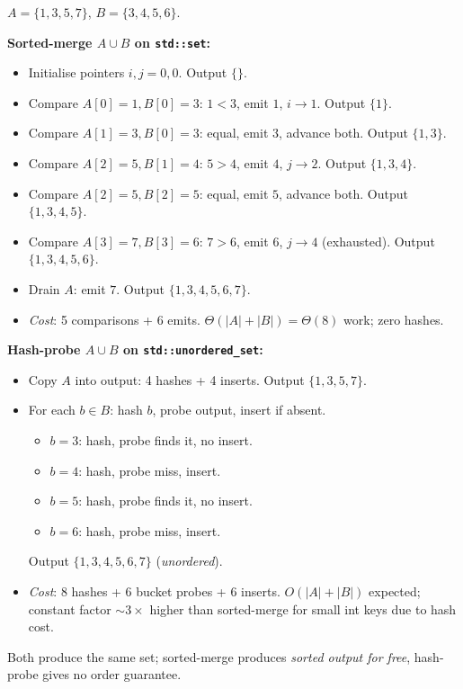 \documentclass[11pt]{article}
\begin{document}
\begin{examplebox}
$A = \{1, 3, 5, 7\}$, $B = \{3, 4, 5, 6\}$.

\textbf{Sorted-merge $A \cup B$ on \texttt{std::set}:}
\begin{itemize}[leftmargin=*]
    \item Initialise pointers $i, j = 0, 0$. Output $\{\}$.
    \item Compare $A[0]=1, B[0]=3$: $1 < 3$, emit $1$, $i \to 1$.
          Output $\{1\}$.
    \item Compare $A[1]=3, B[0]=3$: equal, emit $3$, advance both.
          Output $\{1, 3\}$.
    \item Compare $A[2]=5, B[1]=4$: $5 > 4$, emit $4$, $j \to 2$.
          Output $\{1, 3, 4\}$.
    \item Compare $A[2]=5, B[2]=5$: equal, emit $5$, advance both.
          Output $\{1, 3, 4, 5\}$.
    \item Compare $A[3]=7, B[3]=6$: $7 > 6$, emit $6$, $j \to 4$
          (exhausted). Output $\{1, 3, 4, 5, 6\}$.
    \item Drain $A$: emit $7$. Output $\{1, 3, 4, 5, 6, 7\}$.
    \item \emph{Cost}: 5 comparisons + 6 emits.
          $\Theta(|A| + |B|) = \Theta(8)$ work; zero hashes.
\end{itemize}

\textbf{Hash-probe $A \cup B$ on \texttt{std::unordered\_set}:}
\begin{itemize}[leftmargin=*]
    \item Copy $A$ into output: 4 hashes + 4 inserts. Output
          $\{1, 3, 5, 7\}$.
    \item For each $b \in B$: hash $b$, probe output, insert if
          absent.
          \begin{itemize}
              \item $b=3$: hash, probe finds it, no insert.
              \item $b=4$: hash, probe miss, insert.
              \item $b=5$: hash, probe finds it, no insert.
              \item $b=6$: hash, probe miss, insert.
          \end{itemize}
          Output $\{1, 3, 4, 5, 6, 7\}$ (\emph{unordered}).
    \item \emph{Cost}: 8 hashes + 6 bucket probes + 6 inserts.
          $O(|A| + |B|)$ expected; constant factor $\sim 3 \times$
          higher than sorted-merge for small int keys due to hash
          cost.
\end{itemize}

Both produce the same set; sorted-merge produces \emph{sorted output
for free}, hash-probe gives no order guarantee.
\end{examplebox}
\end{document}
